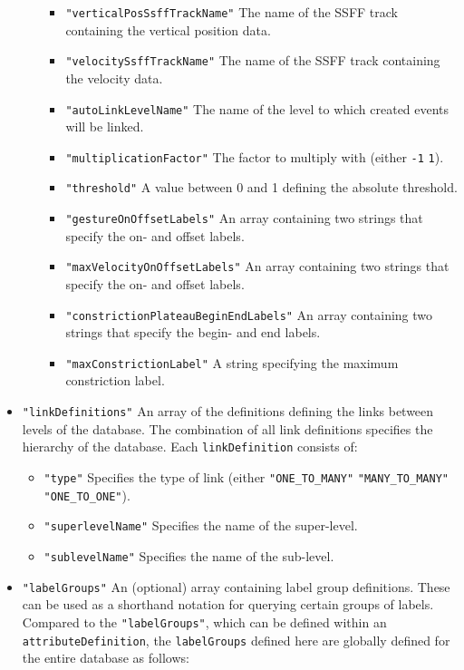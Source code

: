 \documentclass[]{book}
\theoremstyle{definition}
\theoremstyle{definition}
\theoremstyle{definition}
\theoremstyle{remark}
\begin{document}
\begin{itemize}
\begin{itemize}
    \begin{itemize}
    \item
      \texttt{"verticalPosSsffTrackName"} The name of the SSFF track
      containing the vertical position data.
    \item
      \texttt{"velocitySsffTrackName"} The name of the SSFF track
      containing the velocity data.
    \item
      \texttt{"autoLinkLevelName"} The name of the level to which
      created events will be linked.
    \item
      \texttt{"multiplicationFactor"} The factor to multiply with
      (either \texttt{-1} \texttt{1}).
    \item
      \texttt{"threshold"} A value between 0 and 1 defining the absolute
      threshold.
    \item
      \texttt{"gestureOnOffsetLabels"} An array containing two strings
      that specify the on- and offset labels.
    \item
      \texttt{"maxVelocityOnOffsetLabels"} An array containing two
      strings that specify the on- and offset labels.
    \item
      \texttt{"constrictionPlateauBeginEndLabels"} An array containing
      two strings that specify the begin- and end labels.
    \item
      \texttt{"maxConstrictionLabel"} A string specifying the maximum
      constriction label.
    \end{itemize}
  \end{itemize}
\item
  \texttt{"linkDefinitions"} An array of the definitions defining the
  links between levels of the database. The combination of all link
  definitions specifies the hierarchy of the database. Each
  \texttt{linkDefinition} consists of:

  \begin{itemize}
  \item
    \texttt{"type"} Specifies the type of link (either
    \texttt{"ONE\_TO\_MANY"} \texttt{"MANY\_TO\_MANY"}
    \texttt{"ONE\_TO\_ONE"}).
  \item
    \texttt{"superlevelName"} Specifies the name of the super-level.
  \item
    \texttt{"sublevelName"} Specifies the name of the sub-level.
  \end{itemize}
\item
  \texttt{"labelGroups"} An (optional) array containing label group
  definitions. These can be used as a shorthand notation for querying
  certain groups of labels. Compared to the \texttt{"labelGroups"},
  which can be defined within an \texttt{attributeDefinition}, the
  \texttt{labelGroups} defined here are globally defined for the entire
  database as follows:


\end{itemize}
\end{document}
